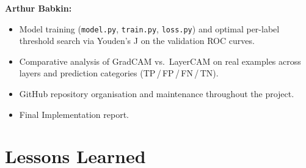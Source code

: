 \documentclass[12pt]{article}
\begin{document}
\textbf{Arthur Babkin:}
\begin{itemize}[leftmargin=*]
    \item Model training (\texttt{model.py}, \texttt{train.py}, \texttt{loss.py}) and optimal per-label threshold search via Youden's J on the validation ROC curves.
    \item Comparative analysis of GradCAM vs.\ LayerCAM on real examples across layers and prediction categories (TP\,/\,FP\,/\,FN\,/\,TN).
    \item GitHub repository organisation and maintenance throughout the project.
    \item Final Implementation report.
\end{itemize}

\section{Lessons Learned}
\end{document}

